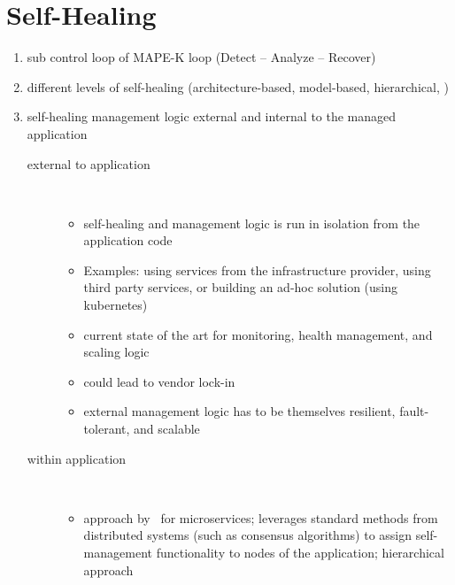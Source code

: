 
\section{Self-Healing}
  \begin{enumerate}
    \item sub control loop of MAPE-K loop (Detect -- Analyze -- Recover)~\cite{PsaierSurvey}
    \item different levels of self-healing (architecture-based, model-based, hierarchical, \etc)
    \item self-healing management logic external and internal to the managed application
      \begin{description}
        \item[external to application]\hfill\\
          \begin{itemize}
            \item self-healing and management logic is run in isolation from the application code
            \item Examples: using services from the infrastructure provider, using third party services, or building an ad-hoc solution (\eg using \gls{kubernetes})~\cite{ToffettiMicroservices}
            \item current state of the art for monitoring, health management, and scaling logic
            \item could lead to vendor lock-in
            \item external management logic has to be themselves resilient, fault-tolerant, and scalable
          \end{itemize}
        \item[within application]\hfill\\
        \begin{itemize}
          \item approach by~\citeauthor{ToffettiMicroservices} for microservices; leverages standard methods from distributed systems (such as consensus algorithms) to assign self-management functionality to nodes of the application; hierarchical approach~\cite{ToffettiMicroservices}
        \end{itemize}
      \end{description}
  \end{enumerate}

